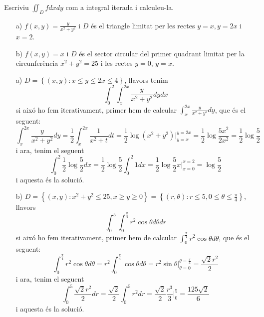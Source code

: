 \documentclass[a4paper, 12pt]{article}
\begin{document}
    \setcounter{numex}{66}
    \begin{exercici}
        Escriviu $\iint_D fdxdy$ com a integral iterada i calculeu-la.
        \begin{itemize}
            \item[a)] $f\left(x,y\right)=\frac{y}{x^2+y^2}$ i $D$ és el triangle limitat per les
            rectes $y = x, y = 2x$ i $x = 2$.
            \item[b)] $f\left(x,y\right)=x$ i $D$ és el sector circular del primer quadrant limitat
            per la circunferència $x^2+y^2=25$ i les rectes $y=0$, $y = x$.
        \end{itemize}
    \end{exercici}
    \begin{solucio}
        \begin{itemize}
            \item[a)] $D = \left\{\left(x,y\right): x\leq y\leq2x\leq4\right\}$, llavors tenim $$\int_0^2\int_{x}^{2x}\frac{y}{x^2+y^2}dydx$$
            si aixó ho fem iterativament, primer hem de calcular $\int_{x}^{2x}\frac{y}{x^2+y^2}dy$,
            que és el seguent:
            $$\int_{x}^{2x}\frac{y}{x^2+y^2}dy = \frac{1}{2}\int_{x}^{2x}\frac{1}{x^2+t} dt = \frac{1}{2}\log(x^2+y^2)\bigg\rvert_{y=x}^{y=2x} = \frac{1}{2}\log{\frac{5x^2}{2x^2}} = \frac{1}{2}\log{\frac{5}{2}}$$
            i ara, tenim el seguent
            $$\int_0^2 \frac{1}{2}\log{\frac{5}{2}} dx = \frac{1}{2} \log{\frac{5}{2}} \int_0^2 1 dx = \frac{1}{2} \log{\frac{5}{2}} x\bigg\rvert_{x=0}^{x=2} = \log{\frac{5}{2}}$$
            i aquesta és la solució.
            \item[b)] $D = \left\{\left(x,y\right): x^2+y^2 \leq 25, x \geq y \geq 0\right\} = \left\{\left(r,\theta\right):r \leq 5, 0\leq\theta\leq\frac{\pi}{4}\right\}$, llavors
            $$\int_{0}^{5}\int_{0}^{\frac{\pi}{4}}r^2\cos{\theta}d\theta dr$$
            si aixó ho fem iterativament, primer hem de calcular $\int_{0}^{\frac{\pi}{4}}r^2\cos{\theta}d\theta$, que és el seguent:
            $$\int_{0}^{\frac{\pi}{4}}r^2\cos{\theta}d\theta = r^2\int_{0}^{\frac{\pi}{4}}\cos{\theta}d\theta = r^2\sin{\theta}\bigg\rvert_{\theta=0}^{\theta=\frac{\pi}{4}} = \frac{\sqrt{2}r^2}{2}$$
            i ara, tenim el seguent
            $$\int_{0}^{5} \frac{\sqrt{2}r^2}{2} dr = \frac{\sqrt{2}}{2} \int_{0}^{5} r^2 dr = \frac{\sqrt{2}}{2} \frac{r^3}{3}\bigg\rvert_0^5 = \frac{125\sqrt{2}}{6}$$
            i aquesta és la solució.
        \end{itemize}
    \end{solucio}
\end{document}

